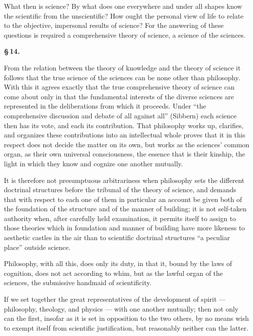 \documentclass[12pt]{book}
\begin{document}
What then is science? By what does one everywhere and under all shapes know the
scientific from the unscientific? How ought the personal view of life to relate to the
objective, impersonal results of science? For the answering of these questions is
required a comprehensive theory of science, a science of the sciences.

\begin{center}{\bfseries \S\,14.}\end{center}

From the relation between the theory of knowledge and the theory of science it follows
that the true science of the sciences can be none other than philosophy. With this it
agrees exactly that the true comprehensive theory of science can come about only in
that the fundamental interests of the diverse sciences are represented in the
deliberations from which
it proceeds. Under ``the comprehensive discussion and debate of all against all''
(Sibbern) each science then has its vote, and each its contribution. That philosophy
works up, clarifies, and organizes these contributions into an intellectual whole
proves that it in this respect does not decide the matter on its own, but works as the
sciences' common organ, as their own universal consciousness, the essence that is their
kinship, the light in which they know and cognize one another mutually.

It is therefore not presumptuous arbitrariness when philosophy sets the different
doctrinal structures before the tribunal of the theory of science, and demands that
with respect to each one of them in particular an account be given both of the
foundation of the structure and of the manner of building; it is not self-taken
authority when, after carefully held examination, it permits itself to assign to those
theories which in foundation and manner of building have more likeness to aesthetic
castles in the air than to scientific doctrinal structures ``a peculiar place'' outside
science.

Philosophy, with all this, does only its duty, in that it, bound by the laws of
cognition, does not act according to whim, but as the lawful organ of the sciences, the
submissive handmaid of scientificity.

If we set together the great representatives of the development of spirit — philosophy,
theology, and physics — with one another mutually; then not only can the first, insofar
as it is set in opposition to the two others, by no means wish to exempt itself from
scientific justification, but reasonably neither can the latter.
\end{document}
